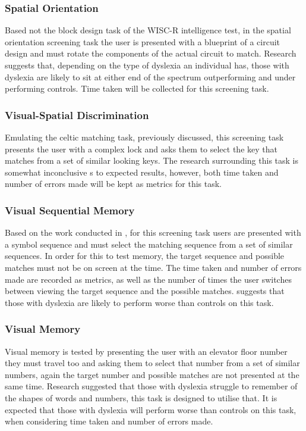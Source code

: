 \documentclass[journal]{IEEEtran}
\begin{document}
\subsubsection{Spatial Orientation} 
Based not the block design task of the WISC-R intelligence test, in the spatial orientation screening task the user is presented with a blueprint of a circuit design and must rotate the components of the actual circuit to match. Research suggests that, depending on the type of dyslexia an individual has, those with dyslexia are likely to sit at either end of the spectrum outperforming and under performing controls. Time taken will be collected for this screening task.

\subsubsection{Visual-Spatial Discrimination} 
Emulating the celtic matching task, previously discussed, this screening task presents the user with a complex lock and asks them to select the key that matches from a set of similar looking keys. The research surrounding this task is somewhat inconclusive s to expected results, however, both time taken and number of errors made will be kept as metrics for this task.

\subsubsection{Visual Sequential Memory} 
Based on the work conducted in \cite{sequential}, for this screening task users are presented with a symbol sequence and must select the matching sequence from a set of similar sequences. In order for this to test memory, the target sequence and possible matches must not be on screen at the time. The time taken and number of errors made are recorded as metrics, as well as the number of times the user switches between viewing the target sequence and the possible matches.
\cite{sequential} suggests that those with dyslexia are likely to perform worse than controls on this task.

\subsubsection{Visual Memory}
Visual memory is tested by presenting the user with an elevator floor number they must travel too and asking them to select that number from a set of similar numbers, again the target number and possible matches are not presented at the same time. Research suggested that those with dyslexia struggle to remember of the shapes of words and numbers, this task is designed to utilise that. It is expected that those with dyslexia will perform worse than controls on this task, when considering time taken and number of errors made.
\end{document}
